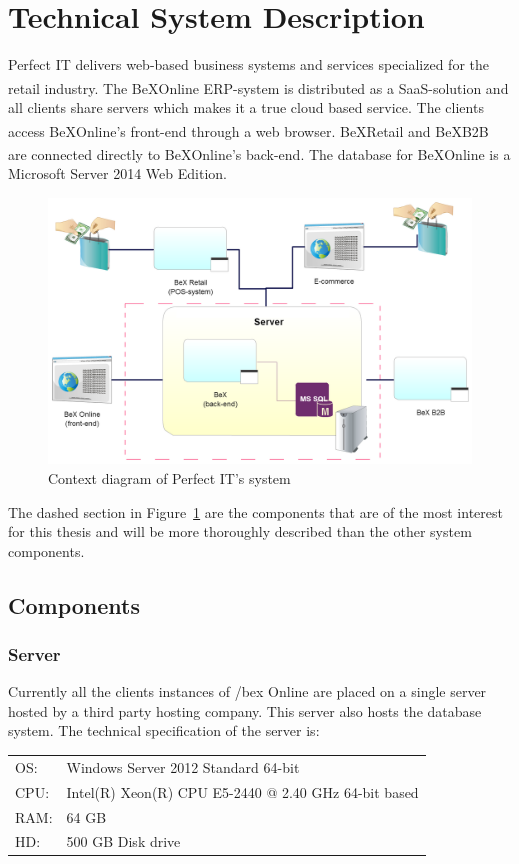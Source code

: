 \documentclass{cslthse-msc}
\newcommand{\bex}{BeX\textsuperscript{\textregistered}}
\begin{document}
\section{Technical System Description}
Perfect IT delivers web-based business systems and services specialized for the retail industry. The \bex Online ERP-system is distributed as a SaaS-solution and all clients share servers which makes it a true cloud based service. The clients access \bex Online's front-end through a web browser. \bex Retail and \bex B2B are connected directly to \bex Online's back-end.
The database for \bex Online is a Microsoft Server 2014 Web Edition.
\begin{figure}[H]
\vspace{-15pt}
  \begin{center}
    \includegraphics[scale=0.3]{Pictures/Systemdesc.png}
  \end{center}
  \caption{Context diagram of Perfect IT's system}
  \label{context}
  \vspace{-15pt}
\end{figure}
\noindent The dashed section in Figure~\ref{context} are the components that are of the most interest for this thesis and will be more thoroughly described than the other system components.

\subsection{Components}


\subsubsection{Server}
Currently all the clients instances of /bex Online are placed on a single server hosted by a third party hosting company. This server also hosts the database system.
The technical specification of the server is:
\begin{table}[H]
\begin{center}
\begin{tabular}{l l}
OS: & Windows Server 2012 Standard 64-bit\\
CPU: & Intel(R) Xeon(R) CPU E5-2440 @ 2.40 GHz 64-bit based\\
RAM: & 64 GB \\
HD: & 500 GB Disk drive
\end{tabular}
\end{center}
\end{table}
\end{document}

